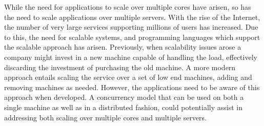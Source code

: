 While the need for applications to scale over multiple cores have arisen, so has the need to scale applications over multiple servers. With the rise of the Internet, the number of very large services supporting millions of users has increased. Due to this, the need for scalable systems, and programming languages which support the scalable approach has arisen. Previously, when scalability issues arose a company might invest in a new machine capable of handling the load, effectively discarding the investment of purchasing the old machine\cite[p. 2]{haller2007actors}. A more modern approach entails scaling the service over a set of low end machines, adding and removing machines as needed. However, the applications need to be aware of this approach when developed. A concurrency model that can be used on both a single machine as well as in a distributed fashion, could potentially assist in addressing both scaling over multiple cores and multiple servers.
\worksheetend
